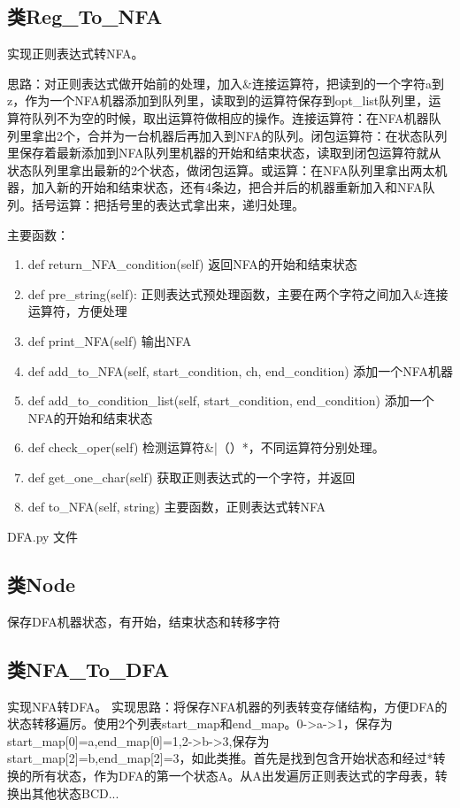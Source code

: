 \documentclass[]{article}
\begin{document}
\subsection{类Reg\_To\_NFA}
实现正则表达式转NFA。

思路：对正则表达式做开始前的处理，加入\&连接运算符，把读到的一个字符a到z，作为一个NFA机器添加到队列里，读取到的运算符保存到opt\_list队列里，运算符队列不为空的时候，取出运算符做相应的操作。连接运算符：在NFA机器队列里拿出2个，合并为一台机器后再加入到NFA的队列。闭包运算符：在状态队列里保存着最新添加到NFA队列里机器的开始和结束状态，读取到闭包运算符就从状态队列里拿出最新的2个状态，做闭包运算。或运算：在NFA队列里拿出两太机器，加入新的开始和结束状态，还有4条边，把合并后的机器重新加入和NFA队列。括号运算：把括号里的表达式拿出来，递归处理。

主要函数：
\begin{enumerate}
	\item def return\_NFA\_condition(self)  返回NFA的开始和结束状态
	\item def pre\_string(self):  正则表达式预处理函数，主要在两个字符之间加入\&连接运算符，方便处理
	\item def print\_NFA(self)  输出NFA
	\item def add\_to\_NFA(self, start\_condition, ch, end\_condition)  添加一个NFA机器
	\item def add\_to\_condition\_list(self, start\_condition, end\_condition)  添加一个NFA的开始和结束状态
	\item   def check\_oper(self)  检测运算符\&|（）*，不同运算符分别处理。
	\item   def get\_one\_char(self)  获取正则表达式的一个字符，并返回
	\item   def to\_NFA(self, string)  主要函数，正则表达式转NFA
\end{enumerate}
DFA.py 文件

\subsection{类Node}
保存DFA机器状态，有开始，结束状态和转移字符

\subsection{类NFA\_To\_DFA}
实现NFA转DFA。
实现思路：将保存NFA机器的列表转变存储结构，方便DFA的状态转移遍厉。使用2个列表start\_map和end\_map。0->a->1，保存为 start\_map[0]=a,end\_map[0]=1,2->b->3,保存为start\_map[2]=b,end\_map[2]=3，如此类推。首先是找到包含开始状态和经过*转换的所有状态，作为DFA的第一个状态A。从A出发遍厉正则表达式的字母表，转换出其他状态BCD...
\end{document}
